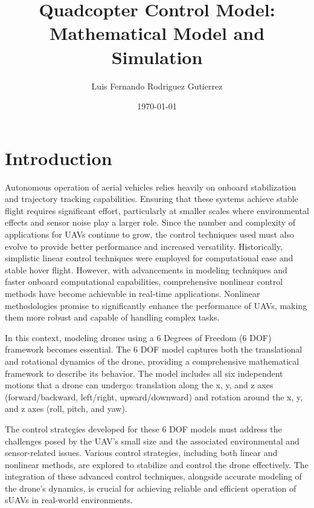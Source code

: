 \documentclass[a4paper,12pt]{report}
\begin{document}
\title{Quadcopter Control Model: Mathematical Model and Simulation}
\author{Luis Fernando Rodriguez Gutierrez}
\date{\today}
\maketitle

\tableofcontents

\chapter{Introduction}
Autonomous operation of aerial vehicles relies heavily on onboard stabilization and trajectory tracking capabilities. 
Ensuring that these systems achieve stable flight requires significant effort, particularly at smaller scales where environmental effects and sensor noise play a larger role. 
Since the number and complexity of applications for UAVs continue to grow, the control techniques used must also evolve to provide better performance and increased versatility.
Historically, simplistic linear control techniques were employed for computational ease and stable hover flight. 
However, with advancements in modeling techniques and faster onboard computational capabilities, comprehensive nonlinear control methods have become achievable in real-time applications.
Nonlinear methodologies promise to significantly enhance the performance of UAVs, making them more robust and capable of handling complex tasks.

In this context, modeling drones using a 6 Degrees of Freedom (6 DOF) framework becomes essential. 
The 6 DOF model captures both the translational and rotational dynamics of the drone, providing a comprehensive mathematical framework to describe its behavior. 
The model includes all six independent motions that a drone can undergo: translation along the x, y, and z axes (forward/backward, left/right, upward/downward) and rotation around the x, y, and z axes (roll, pitch, and yaw).

The control strategies developed for these 6 DOF models must address the challenges posed by the UAV's small size and the associated environmental and sensor-related issues. 
Various control strategies, including both linear and nonlinear methods, are explored to stabilize and control the drone effectively. The integration of these advanced control techniques, alongside accurate modeling of the drone's dynamics, is crucial for achieving reliable and efficient operation of sUAVs in real-world environments.
\end{document}
